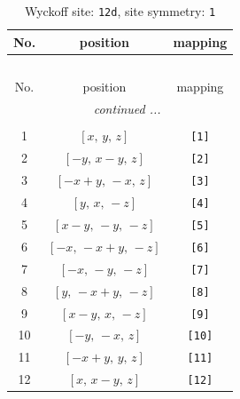 \documentclass[fleqn,8pt]{jsarticle}
\begin{document}
\renewcommand{\arraystretch}{1.2}
\begin{longtable}{ccc}
\caption{Wyckoff site: {\tt 12d}, site symmetry: {\tt 1}}
 \\
 \hline \hline
No. & position & mapping \\ \hline \endfirsthead

\multicolumn{2}{l}{\tablename\ \thetable{}} \\
 \hline \hline
No. & position & mapping \\ \hline \endhead

 \hline \hline
\multicolumn{2}{r}{\footnotesize\it continued ...} \\ \endfoot

 \hline \hline
\multicolumn{2}{r}{} \\ \endlastfoot

1 & $\left[ x,\, y,\, z \right]$ & {\tt [1]} \\ \hline
2 & $\left[ - y,\, x - y,\, z \right]$ & {\tt [2]} \\ \hline
3 & $\left[ - x + y,\, - x,\, z \right]$ & {\tt [3]} \\ \hline
4 & $\left[ y,\, x,\, - z \right]$ & {\tt [4]} \\ \hline
5 & $\left[ x - y,\, - y,\, - z \right]$ & {\tt [5]} \\ \hline
6 & $\left[ - x,\, - x + y,\, - z \right]$ & {\tt [6]} \\ \hline
7 & $\left[ - x,\, - y,\, - z \right]$ & {\tt [7]} \\ \hline
8 & $\left[ y,\, - x + y,\, - z \right]$ & {\tt [8]} \\ \hline
9 & $\left[ x - y,\, x,\, - z \right]$ & {\tt [9]} \\ \hline
10 & $\left[ - y,\, - x,\, z \right]$ & {\tt [10]} \\ \hline
11 & $\left[ - x + y,\, y,\, z \right]$ & {\tt [11]} \\ \hline
12 & $\left[ x,\, x - y,\, z \right]$ & {\tt [12]} \\
\end{longtable}
\end{document}
